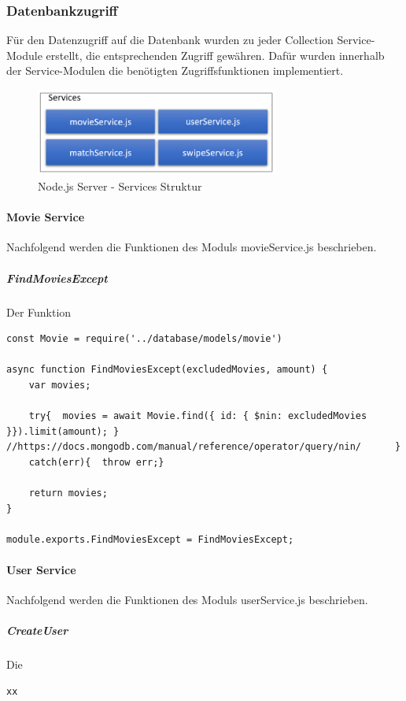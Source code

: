 \subsubsection{Datenbankzugriff}                   
Für den Datenzugriff auf die Datenbank wurden zu jeder Collection Service-Module erstellt, die entsprechenden Zugriff gewähren. Dafür wurden innerhalb der Service-Modulen die benötigten Zugriffsfunktionen implementiert.

\begin{figure}[h]
\centering
\includegraphics[width=8cm]{images/serviceStruktur.PNG}
\caption{Node.js Server - Services Struktur}
\end{figure}

\paragraph{Movie Service}
Nachfolgend werden die Funktionen des Moduls movieService.js beschrieben.

\subparagraph{FindMoviesExcept}
Der Funktion

\begin{lstlisting}[caption=movieService.js - FindMoviesExcept, label=lst:findmoviesexcept]
const Movie = require('../database/models/movie')

async function FindMoviesExcept(excludedMovies, amount) {
    var movies;

    try{  movies = await Movie.find({ id: { $nin: excludedMovies }}).limit(amount); } //https://docs.mongodb.com/manual/reference/operator/query/nin/      }
    catch(err){  throw err;}

    return movies;
}

module.exports.FindMoviesExcept = FindMoviesExcept;
\end{lstlisting}

\paragraph{User Service}
Nachfolgend werden die Funktionen des Moduls userService.js beschrieben.

\subparagraph{CreateUser}
Die

\begin{lstlisting}[caption=TODO, label=lst:TODO]
xx
\end{lstlisting}

